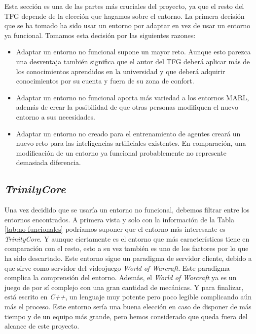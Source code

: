Esta sección es una de las partes más cruciales del proyecto, ya que el resto del TFG depende de la elección que hagamos sobre el entorno. La primera decisión que se ha tomado ha sido usar un entorno por adaptar en vez de usar un entorno ya funcional. Tomamos esta decisión por las siguientes razones:

\begin{itemize}
    \item Adaptar un entorno no funcional supone un mayor reto. Aunque esto parezca una desventaja también significa que el autor del TFG deberá aplicar más de los conocimientos aprendidos en la universidad y que deberá adquirir conocimientos por su cuenta y fuera de su zona de confort.
    \item Adaptar un entorno no funcional aporta más variedad a los entornos MARL, además de crear la posibilidad de que otras personas modifiquen el nuevo entorno a sus necesidades.
    \item Adaptar un entorno no creado para el entrenamiento de agentes creará un nuevo reto para las inteligencias artificiales existentes. En comparación, una modificación de un entorno ya funcional probablemente no represente demasiada diferencia.
\end{itemize}

\subsection{\textit{TrinityCore}}

Una vez decidido que se usaría un entorno no funcional, debemos filtrar entre los entornos encontrados. A primera vista y solo con la información de la Tabla \ref {tab:no-funcionales} podríamos suponer que el entorno más interesante es \textit{TrinityCore}. Y aunque ciertamente es el entorno que más características tiene en comparación con el resto, esto a su vez también es uno de los factores por lo que ha sido descartado. Este entorno sigue un paradigma de servidor cliente, debido a que sirve como servidor del videojuego \textit{World of Warcraft}. Este paradigma complica la comprensión del entorno. Además, el \textit{World of Warcraft} ya es un juego de por sí complejo con una gran cantidad de mecánicas. Y para finalizar, está escrito en \textit{C++}, un lenguaje muy potente pero poco legible complicando aún más el proceso. Este entorno sería una buena elección en caso de disponer de más tiempo y de un equipo más grande, pero  hemos considerado que queda fuera del alcance de este proyecto.

